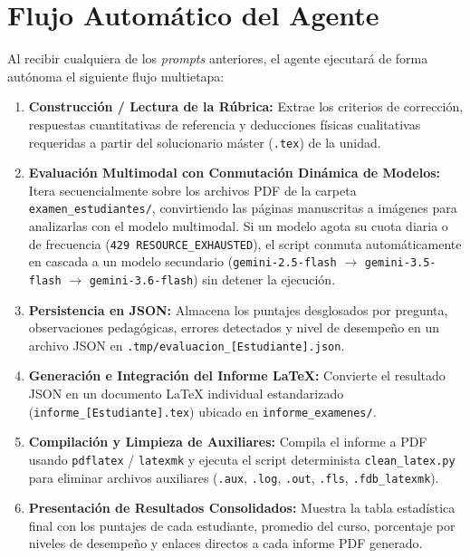 \documentclass[12pt,letterpaper]{article}
\begin{document}
\section{Flujo Automático del Agente}

\begin{autobox}
Al recibir cualquiera de los \textit{prompts} anteriores, el agente ejecutará de forma autónoma el siguiente flujo multietapa:

\begin{enumerate}[leftmargin=*]
    \item \textbf{Construcción / Lectura de la Rúbrica:}
    Extrae los criterios de corrección, respuestas cuantitativas de referencia y deducciones físicas cualitativas requeridas a partir del solucionario máster (\texttt{.tex}) de la unidad.

    \item \textbf{Evaluación Multimodal con Conmutación Dinámica de Modelos:}
    Itera secuencialmente sobre los archivos PDF de la carpeta \texttt{examen\_estudiantes/}, convirtiendo las páginas manuscritas a imágenes para analizarlas con el modelo multimodal. Si un modelo agota su cuota diaria o de frecuencia (\texttt{429 RESOURCE\_EXHAUSTED}), el script conmuta automáticamente en cascada a un modelo secundario (\texttt{gemini-2.5-flash} $\rightarrow$ \texttt{gemini-3.5-flash} $\rightarrow$ \texttt{gemini-3.6-flash}) sin detener la ejecución.

    \item \textbf{Persistencia en JSON:}
    Almacena los puntajes desglosados por pregunta, observaciones pedagógicas, errores detectados y nivel de desempeño en un archivo JSON en \texttt{.tmp/evaluacion\_[Estudiante].json}.

    \item \textbf{Generación e Integración del Informe LaTeX:}
    Convierte el resultado JSON en un documento LaTeX individual estandarizado (\texttt{informe\_[Estudiante].tex}) ubicado en \texttt{informe\_examenes/}.

    \item \textbf{Compilación y Limpieza de Auxiliares:}
    Compila el informe a PDF usando \texttt{pdflatex} / \texttt{latexmk} y ejecuta el script determinista \texttt{clean\_latex.py} para eliminar archivos auxiliares (\texttt{.aux}, \texttt{.log}, \texttt{.out}, \texttt{.fls}, \texttt{.fdb\_latexmk}).

    \item \textbf{Presentación de Resultados Consolidados:}
    Muestra la tabla estadística final con los puntajes de cada estudiante, promedio del curso, porcentaje por niveles de desempeño y enlaces directos a cada informe PDF generado.
\end{enumerate}
\end{autobox}
\end{document}
